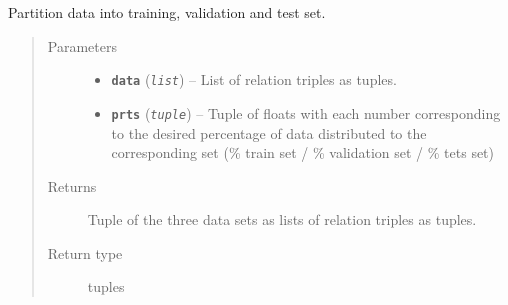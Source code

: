 \documentclass[letterpaper,10pt,english]{sphinxmanual}
\begin{document}

\begin{fulllineitems}
\label{src.trans_e:src.trans_e.partition_data.partition_data}
\end{fulllineitems}


\begin{fulllineitems}
\label{src.trans_e:src.trans_e.partition_data.partition_relation_wise}
Partition data into training, validation and test set.
\begin{quote}\begin{description}
\item[{Parameters}] \leavevmode\begin{itemize}
\item {} 
\textbf{\texttt{data}} (\emph{\texttt{list}}) -- List of relation triples as tuples.

\item {} 
\textbf{\texttt{prts}} (\emph{\texttt{tuple}}) -- Tuple of floats with each number corresponding to the desired percentage of data distributed to
the corresponding set (\% train set / \% validation set / \% tets set)

\end{itemize}

\item[{Returns}] \leavevmode
Tuple of the three data sets as lists of relation triples as tuples.

\item[{Return type}] \leavevmode
tuples

\end{description}\end{quote}

\end{fulllineitems}


\begin{fulllineitems}
\label{src.trans_e:src.trans_e.partition_data.partition_whole}
\end{fulllineitems}
\end{document}
